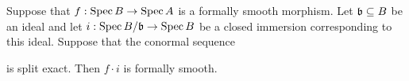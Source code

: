 \begin{theorem}\label{theorem:if_conormal_sequence_is_split_exact_then_morphisms_is_formally_smooth}
Suppose that $f:\mathrm{Spec}\, B\rightarrow \mathrm{Spec}\, A$ is a formally smooth morphism. Let $\mathfrak{b} \subseteq B$ be an ideal and let $i:\mathrm{Spec}\, B/\mathfrak{b}\rightarrow \mathrm{Spec}\, B$ be a closed immersion corresponding to this ideal. Suppose that the conormal sequence
\begin{center}
\end{center}
is split exact. Then $f\cdot i$ is formally smooth.  
\end{theorem}
